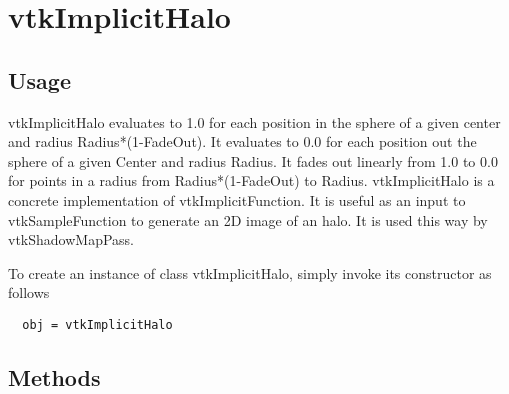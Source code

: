 \section{vtkImplicitHalo}

\subsection{Usage}

 vtkImplicitHalo evaluates to 1.0 for each position in the sphere of a
 given center and radius Radius*(1-FadeOut). It evaluates to 0.0 for each
 position out the sphere of a given Center and radius Radius. It fades out
 linearly from 1.0 to 0.0 for points in a radius from Radius*(1-FadeOut) to
 Radius.
 vtkImplicitHalo is a concrete implementation of vtkImplicitFunction. 
 It is useful as an input to
 vtkSampleFunction to generate an 2D image of an halo. It is used this way by
 vtkShadowMapPass.

To create an instance of class vtkImplicitHalo, simply
invoke its constructor as follows
\begin{verbatim}
  obj = vtkImplicitHalo
\end{verbatim}
\subsection{Methods}

